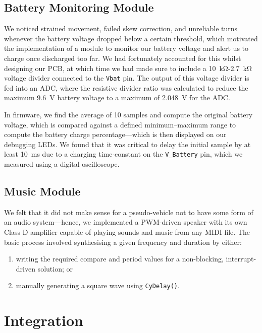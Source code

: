 \documentclass[conference]{IEEEtran}
\begin{document}
\subsection{Battery Monitoring Module}

We noticed strained movement, failed skew correction, and unreliable turns whenever the battery voltage dropped below a certain threshold, which motivated the implementation of a module to monitor our battery voltage and alert us to charge once discharged too far.
We had fortunately accounted for this whilst designing our PCB, at which time we had made sure to include a \qty{10}{\kohm}-\qty{2.7}{\kohm} voltage divider connected to the \texttt{Vbat} pin.
The output of this voltage divider is fed into an ADC, where the resistive divider ratio was calculated to reduce the maximum \qty{9.6}{\volt} battery voltage to a maximum of \qty{2.048}{\volt} for the ADC.

In firmware, we find the average of 10 samples and compute the original battery voltage, which is compared against a defined minimum–maximum range to compute the battery charge percentage—which is then displayed on our debugging LEDs.
We found that it was critical to delay the initial sample by at least \qty{10}{\ms} due to a charging time-constant on the \texttt{V\_Battery} pin, which we measured using a digital oscilloscope.

\subsection{Music Module}

We felt that it did not make sense for a pseudo-vehicle not to have some form of an audio system—hence, we implemented a PWM-driven speaker with its own Class D amplifier capable of playing sounds and music from any MIDI file.
The basic process involved synthesising a given frequency and duration by either:
\begin{enumerate}
	\item writing the required compare and period values for a non-blocking, interrupt-driven solution; or
	\item manually generating a square wave using \texttt{CyDelay()}.
\end{enumerate}



\section{Integration}
\end{document}

